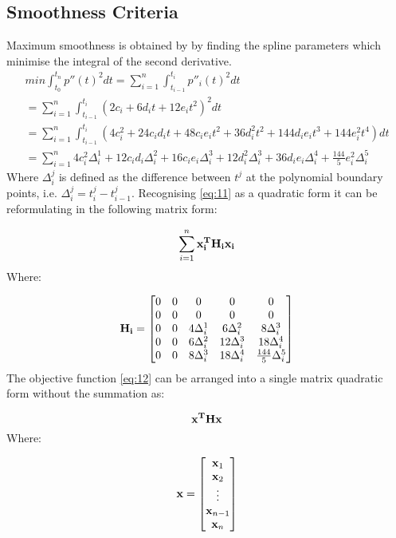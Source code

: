 \documentclass{article}
\begin{document}
\subsection{Smoothness Criteria}
Maximum smoothness is obtained by by finding the spline 
parameters which minimise the integral of the second derivative.
\begin{eqnarray}
    \label{eq:11}
    \nonumber
    min \int_{t_0}^{t_n}p''(t)^2 dt = \sum_{i=1}^{n}\int_{t_{i - 1}}^{t_i}p''_i(t)^2dt \\
    \nonumber
    =\sum_{i=1}^{n}\int_{t_{i - 1}}^{t_i} (2 c_i + 6 d_i t + 12 e_i t^2)^2dt \\
    \nonumber
    =\sum_{i=1}^{n}\int_{t_{i - 1}}^{t_i} (4 c_i^2 + 24 c_i d_i t + 48 c_i e_i t^2 +
    36 d_i^2 t^2 + 144 d_i e_i t^3 + 144 e_i^2 t^4)dt \\
    =\sum_{i=1}^{n} 4 c_i^2 \Delta_i^1 + 12 c_i d_i \Delta_i^2
    + 16 c_i e_i \Delta_i^3 + 12 d_i^2 \Delta_i^3 + 36 d_i e_i \Delta_i^4 +
    \frac{144}{5} e_i^2 \Delta_i^5
\end{eqnarray}
Where $\Delta_i^j$ is defined as the difference between $t^j$ at the polynomial boundary points, 
i.e. $\Delta_i^j = t_i^j - t_{i-1}^j$.
Recognising \ref{eq:11} as a quadratic form it can be reformulating in the following matrix form:


\begin{equation}
    \label{eq:12}
    \sum_{i=1}^{n}\mathbf{x_i^TH_ix_i}
\end{equation}
Where:

\begin{equation*}
    \mathbf{H_i} = \begin{bmatrix}
        0 & 0 & 0 & 0 & 0 \\
        0 & 0 & 0 & 0 & 0 \\
        0 & 0 & 4 \Delta_i^1 & 6 \Delta_i^2 & 8 \Delta_i^3 \\
        0 & 0 & 6 \Delta_i^2 & 12 \Delta_i^3 & 18 \Delta_i^4 \\
        0 & 0 & 8 \Delta_i^3 & 18 \Delta_i^4 & \frac{144}{5} \Delta_i^5
    \end{bmatrix}
\end{equation*}
The objective function \ref{eq:12} can be arranged into a single matrix quadratic form without
the summation as:

\begin{equation}
    \mathbf{x^THx}
\end{equation}
Where:

\begin{equation*}
    \mathbf{x} = \begin{bmatrix}
        \mathbf{x}_1 \\
        \mathbf{x}_2 \\
        \vdots \\
        \mathbf{x}_{n-1} \\
        \mathbf{x}_n \\
    \end{bmatrix}
\end{equation*}
\end{document}
